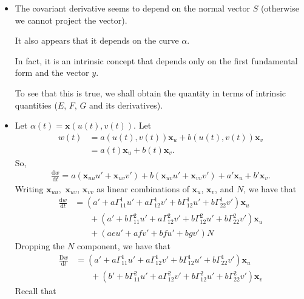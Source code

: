 \documentclass[10pt]{article}
\newtheorem{definition}[lemma]{Definition}
\newcommand{\dee}{\mathrm{d}}
\newcommand{\Dee}{\mathrm{D}}
\newcommand{\ve}[1]{\mathbf{#1}}
\begin{document}
\begin{itemize}
\begin{definition}
      This covariant derivative is denoted by $(\Dee w/\dee t)(0)$ or $(\Dee_y w)(p)$.
    \end{definition}

    \item The covariant derivative seems to depend on the normal vector $S$ (otherwise we cannot project the vector).

    It also appears that it depends on the curve $\alpha$.

    In  fact, it is an intrinsic concept that depends only on the first fundamental form and the vector $y$.

    To see that this is true, we shall obtain the quantity in terms of intrinsic quantities ($E$, $F$, $G$ and its derivatives).

    \item Let $\alpha(t) = \ve{x}(u(t), v(t))$. Let
    \begin{align*}
      w(t) 
      &= a(u(t),v(t))\ve{x}_u + b(u(t), v(t))\ve{x}_v \\
      &= a(t)\ve{x}_u + b(t)\ve{x}_v.
    \end{align*}
    So,
    \begin{align*}
      \frac{\dee w}{\dee t} = a(\ve{x}_{uu} u' + \ve{x}_{uv} v') + b(\ve{x}_{uv}u' + \ve{x}_{vv}v') + a'\ve{x}_u + b'\ve{x}_v.
    \end{align*}
    Writing $\ve{x}_{uu},$ $\ve{x}_{uv}$, $\ve{x}_{vv}$ as linear combinations of $\ve{x}_u$, $\ve{x}_v$, and $N$, we have that
    \begin{align*}
      \frac{\dee w}{\dee t} 
      &= (a' + a \Gamma_{11}^1 u' + a \Gamma_{12}^1 v' + b \Gamma^1_{12} u' + b \Gamma^1_{22} v') \ve{x}_u\\
      & \phantom{\ = \ } + (a' + b \Gamma_{11}^2 u' + a \Gamma_{12}^2 v' + b \Gamma^2_{12} u' + b \Gamma^2_{22} v') \ve{x}_u\\
      & \phantom{\ = \ } + (a e u' + a f v' + b f u' + b g v') N
    \end{align*}
    Dropping the $N$ component, we have that
    \begin{align*}
      \frac{\Dee w}{\dee t} 
      &= (a' + a \Gamma_{11}^1 u' + a \Gamma_{12}^1 v' + b \Gamma^1_{12} u' + b \Gamma^1_{22} v') \ve{x}_u\\
      & \phantom{\ = \ } + (b' + b \Gamma_{11}^2 u' + a \Gamma_{12}^2 v' + b \Gamma^2_{12} u' + b \Gamma^2_{22} v') \ve{x}_v
    \end{align*}
    Recall that
    \begin{align*}

\end{align*}
\end{itemize}
\end{document}
